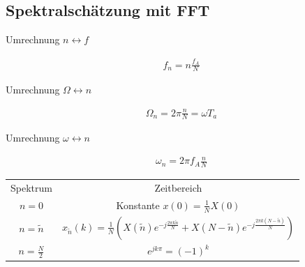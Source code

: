 \documentclass[10pt,a4paper]{article}
\begin{document}
  \subsection{Spektralschätzung mit FFT}
  Umrechnung $n \leftrightarrow f$
  \begin{mdframed}[style=exercise]
    \begin{align}
        f_n = n\frac{f_A}{N}
    \end{align}
  \end{mdframed}
  Umrechnung $\Omega \leftrightarrow n$
  \begin{mdframed}[style=exercise]
    \begin{align}
        \Omega_n = 2\pi\frac{n}{N} = \omega T_a
    \end{align}
  \end{mdframed}
  Umrechnung $\omega \leftrightarrow n$
  \begin{mdframed}[style=exercise]
    \begin{align}
        \omega_n = 2\pi f_A\frac{n}{N} 
    \end{align}
  \end{mdframed}
    \begin{center}
    \begin{tabular}{c c}
        Spektrum & Zeitbereich \\
        $n=0$ & Konstante $x(0)=\frac{1}{N}X(0)$\\
        $n=\tilde{n}$ & $ x_{\tilde{n}}(k)=\frac{1}{N}( X(\tilde{n})e^{-j\frac{2\pi k\tilde{n}}{N}}+X(N-\tilde{n})e^{-j\frac{2\pi k(N-\tilde{n})}{N}})$\\
        $n=\frac{N}{2}$ & $e^{jk\pi} = (-1)^k$\\
    \end{tabular}
    \end{center}
\end{document}
